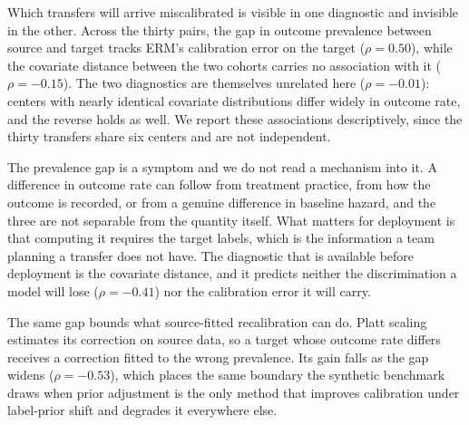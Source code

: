 
Which transfers will arrive miscalibrated is visible in one diagnostic and
invisible in the other. Across the thirty pairs, the gap in outcome prevalence
between source and target tracks ERM's calibration error on the target
($\rho=0.50$), while the covariate distance between the two cohorts carries no
association with it ($\rho=-0.15$). The two diagnostics are themselves unrelated
here ($\rho=-0.01$): centers with nearly identical covariate distributions
differ widely in outcome rate, and the reverse holds as well. We report these
associations descriptively, since the thirty transfers share six centers and are
not independent.

The prevalence gap is a symptom and we do not read a mechanism into it. A
difference in outcome rate can follow from treatment practice, from how the
outcome is recorded, or from a genuine difference in baseline hazard, and the
three are not separable from the quantity itself. What matters for deployment is
that computing it requires the target labels, which is the information a team
planning a transfer does not have. The diagnostic that is available before
deployment is the covariate distance, and it predicts neither the discrimination
a model will lose \mbox{($\rho=-0.41$)} nor the calibration error it will carry.

The same gap bounds what source-fitted recalibration can do. Platt scaling
estimates its correction on source data, so a target whose outcome rate differs
receives a correction fitted to the wrong prevalence. Its gain falls as the gap
widens ($\rho=-0.53$), which places the same boundary the synthetic benchmark
draws when prior adjustment is the only method that improves calibration under
label-prior shift and degrades it everywhere else.
